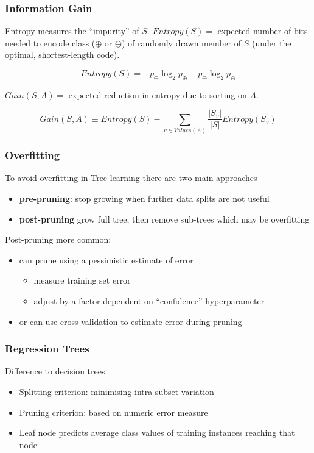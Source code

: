\subsubsection{Information Gain}

Entropy measures the ``impurity'' of \(S\). \(Entropy(S) = \) expected number of bits needed to encode class (\(\oplus\) or \(\ominus\)) of randomly drawn member of \(S\) (under the optimal, shortest-length code).

\[Entropy(S) = -p_\oplus \log_2 p_\oplus - p_\ominus \log_2 p_\ominus\]

\(Gain(S, A) = \) expected reduction in entropy due to sorting on \(A\).

\[Gain(S, A) \equiv Entropy(S) - \sum_{v \in Values(A)} \frac{|S_v|}{|S|}Entropy(S_v)\]

\subsubsection{Overfitting}

To avoid overfitting in Tree learning there are two main approaches
\begin{itemize}
    \item \textbf{pre-pruning}: stop growing when further data splits are not useful
    \item \textbf{post-pruning} grow full tree, then remove sub-trees which may be overfitting
\end{itemize}

Post-pruning more common:
\begin{itemize}
    \item can prune using a pessimistic estimate of error
    \begin{itemize}
        \item measure training set error
        \item adjust by a factor dependent on ``confidence'' hyperparameter
    \end{itemize}
    \item or can use cross-validation to estimate error during pruning
\end{itemize}

\subsubsection{Regression Trees}

Difference to decision trees:
\begin{itemize}
    \item Splitting criterion: minimising intra-subset variation
    \item Pruning criterion: based on numeric error measure
    \item Leaf node predicts average class values of training instances reaching that node
\end{itemize}

